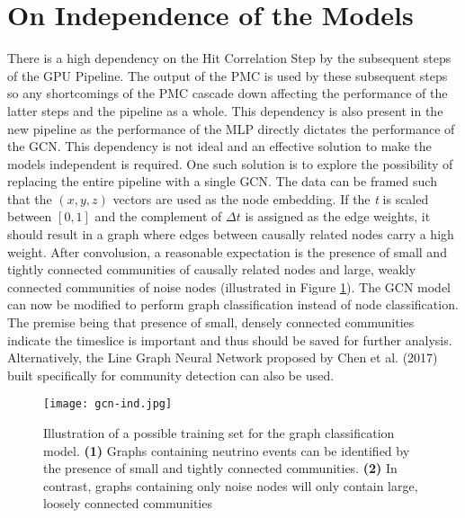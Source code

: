 \section{On Independence of the Models}
There is a high dependency on the Hit Correlation Step by the
subsequent steps of the GPU Pipeline. The output of the PMC is used by
these subsequent steps so any shortcomings of the PMC cascade down
affecting the performance of the latter steps and the pipeline as a
whole. This dependency is also present in the new pipeline as the
performance of the MLP directly dictates the performance of the GCN.
This dependency is not ideal and an effective solution to make the
models independent is required. One such solution is to explore the
possibility of replacing the entire pipeline with a single GCN. The
data can be framed such that the $(x, y, z)$ vectors are used as the
node embedding. If the \emph{t} is scaled between $[0, 1]$ and the
complement of $\Delta t$ is assigned as the edge weights, it should
result in a graph where edges between causally related nodes carry a
high weight. After convolusion, a reasonable expectation is the
presence of small and tightly connected communities of causally
related nodes and large, weakly connected communities of noise nodes
(illustrated in Figure \ref{fig:gcn-ind}). The GCN model can now be
modified to perform graph classification \cite{zhang2018end} instead
of node classification. The premise being that presence of small,
densely connected communities indicate the timeslice is important and
thus should be saved for further analysis. Alternatively, the Line
Graph Neural Network proposed by Chen et al. (2017) built specifically
for community detection can also be used.

\begin{figure}[htb]
  \centering
  \texttt{[image: gcn-ind.jpg]}
  \caption{Illustration of a possible training set for the graph
    classification model. \textbf{(1)} Graphs containing neutrino
    events can be identified by the presence of small and tightly
    connected communities. \textbf{(2)} In contrast, graphs containing
    only noise nodes will only contain large, loosely connected
    communities}
  \label{fig:gcn-ind}
\end{figure}

